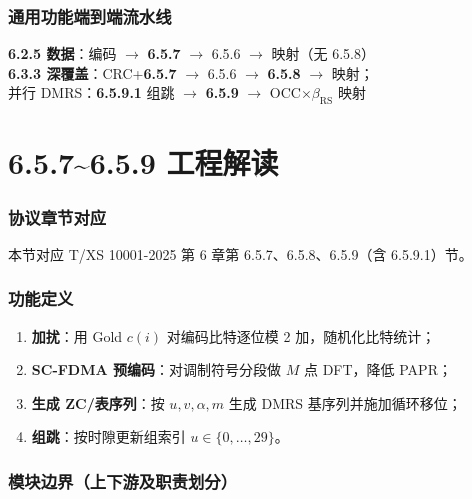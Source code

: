 \documentclass[11pt,a4paper]{ctexart}
\begin{document}
\section{通用功能端到端流水线}

\begin{center}
\small
\textbf{6.2.5 数据}：编码 $\rightarrow$ \textbf{6.5.7} $\rightarrow$ 6.5.6 $\rightarrow$ 映射（无 6.5.8）\\[0.3em]
\textbf{6.3.3 深覆盖}：CRC+\textbf{6.5.7} $\rightarrow$ 6.5.6 $\rightarrow$ \textbf{6.5.8} $\rightarrow$ 映射；\\
并行 DMRS：\textbf{6.5.9.1} 组跳 $\rightarrow$ \textbf{6.5.9} $\rightarrow$ OCC$\times\beta_{\mathrm{RS}}$ 映射
\end{center}

\newpage
\part{6.5.7\textasciitilde 6.5.9 工程解读}

\section{协议章节对应}

本节对应 T/XS 10001-2025 第 6 章第 6.5.7、6.5.8、6.5.9（含 6.5.9.1）节。

\section{功能定义}

\begin{enumerate}[nosep]
  \item \textbf{加扰}：用 Gold $c(i)$ 对编码比特逐位模 2 加，随机化比特统计；
  \item \textbf{SC-FDMA 预编码}：对调制符号分段做 $M$ 点 DFT，降低 PAPR；
  \item \textbf{生成 ZC/表序列}：按 $u,v,\alpha,m$ 生成 DMRS 基序列并施加循环移位；
  \item \textbf{组跳}：按时隙更新组索引 $u\in\{0,\ldots,29\}$。
\end{enumerate}

\section{模块边界（上下游及职责划分）}
\end{document}
